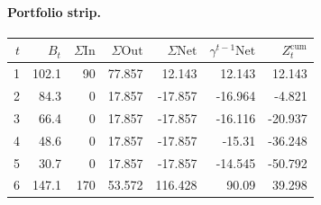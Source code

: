 \documentclass[12pt, a4paper]{article}
\begin{document}
\paragraph{Portfolio strip.}
\begin{center}
\begin{tabular}{rrrrrrr}
\toprule
$t$ & $B_t$ & $\Sigma\mathrm{In}$ & $\Sigma\mathrm{Out}$ & $\Sigma\mathrm{Net}$ & $\gamma^{t-1}\mathrm{Net}$ & $Z_t^{\mathrm{cum}}$\\
\midrule
1 & 102.1 & 90 & 77.857 & 12.143 & 12.143 & 12.143 \\
2 & 84.3 & 0 & 17.857 & -17.857 & -16.964 & -4.821 \\
3 & 66.4 & 0 & 17.857 & -17.857 & -16.116 & -20.937 \\
4 & 48.6 & 0 & 17.857 & -17.857 & -15.31 & -36.248 \\
5 & 30.7 & 0 & 17.857 & -17.857 & -14.545 & -50.792 \\
6 & 147.1 & 170 & 53.572 & 116.428 & 90.09 & 39.298 \\
\bottomrule
\end{tabular}
\end{center}
\end{document}
